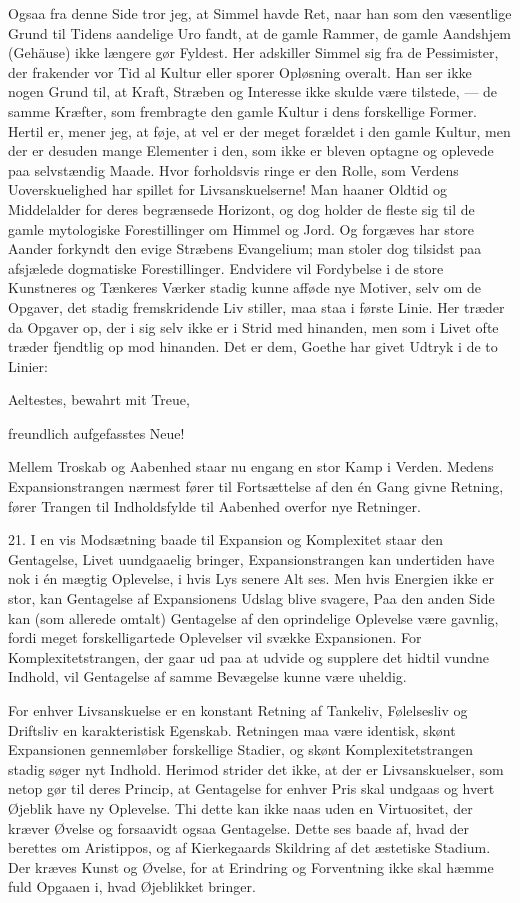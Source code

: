 \documentclass[12pt]{article}
\newcommand{\apage}[1]{\marginnote{\footnotesize\textit{[#1]}}}
\begin{document}
Ogsaa fra denne Side tror jeg, at Simmel havde Ret, naar han som den væsentlige
Grund til Tidens aandelige Uro fandt, at de gamle Rammer, de gamle Aandshjem
(Gehäuse) ikke længere gør Fyldest. Her adskiller Simmel sig fra de
Pessimister, der frakender vor Tid al Kultur eller sporer Opløsning overalt.
Han ser ikke nogen Grund til, at Kraft, Stræben og Interesse ikke skulde være
tilstede, --- de samme Kræfter, som frembragte den gamle
\setcounter{footnote}{0}%
\apage{64}Kultur i dens forskellige Former. Hertil er, mener jeg, at føje, at
vel er der meget forældet i den gamle Kultur, men der er desuden mange
Elementer i den, som ikke er bleven optagne og oplevede paa selvstændig Maade.
Hvor forholdsvis ringe er den Rolle, som Verdens Uoverskuelighed har spillet
for Livsanskuelserne! Man haaner Oldtid og Middelalder for deres begrænsede
Horizont, og dog holder de fleste sig til de gamle mytologiske Forestillinger
om Himmel og Jord. Og forgæves har store Aander forkyndt den evige Stræbens
Evangelium; man stoler dog tilsidst paa afsjælede dogmatiske Forestillinger.
Endvidere vil Fordybelse i de store Kunstneres og Tænkeres Værker stadig kunne
afføde nye Motiver, selv om de Opgaver, det stadig fremskridende Liv stiller,
maa staa i første Linie. Her træder da Opgaver op, der i sig selv ikke er i
Strid med hinanden, men som i Livet ofte træder fjendtlig op mod hinanden. Det
er dem, Goethe har givet Udtryk i de to Linier:

Aeltestes, bewahrt mit Treue,

freundlich aufgefasstes Neue!

Mellem Troskab og Aabenhed staar nu engang en stor Kamp i Verden. Medens
Expansionstrangen nærmest fører til Fortsættelse af den én Gang givne Retning,
fører Trangen til Indholdsfylde til Aabenhed overfor nye Retninger.

21. I en vis Modsætning baade til Expansion og Komplexitet staar den
Gentagelse, Livet uundgaaelig bringer, Expansionstrangen kan undertiden have
nok i én mægtig Oplevelse, i hvis Lys senere Alt ses. Men hvis Energien ikke er
stor, kan Gentagelse af Expansionens Udslag blive svagere, Paa den anden Side
kan (som allerede omtalt) Gentagelse af den oprindelige Oplevelse være gavnlig,
fordi meget forskelligartede Oplevelser vil svække Expansionen.
\setcounter{footnote}{0}%
\apage{65}For Komplexitetstrangen, der gaar ud paa at udvide og supplere det
hidtil vundne Indhold, vil Gentagelse af samme Bevægelse kunne være uheldig.

For enhver Livsanskuelse er en konstant Retning af Tankeliv, Følelsesliv og
Driftsliv en karakteristisk Egenskab. Retningen maa være identisk, skønt
Expansionen gennemløber forskellige Stadier, og skønt Komplexitetstrangen
stadig søger nyt Indhold. Herimod strider det ikke, at der er Livsanskuelser,
som netop gør til deres Princip, at Gentagelse for enhver Pris skal undgaas og
hvert Øjeblik have ny Oplevelse. Thi dette kan ikke naas uden en Virtuositet,
der kræver Øvelse og forsaavidt ogsaa Gentagelse. Dette ses baade af, hvad der
berettes om Aristippos, og af Kierkegaards Skildring af \guillemotright{}det
æstetiske Stadium\guillemotleft{}. Der kræves Kunst og Øvelse, for at Erindring
og Forventning ikke skal hæmme fuld Opgaaen i, hvad Øjeblikket bringer.
\end{document}
